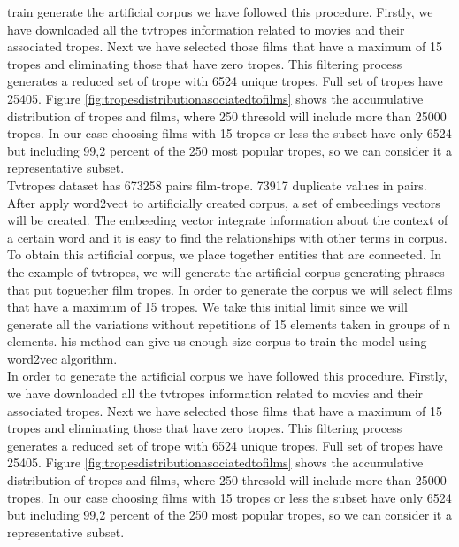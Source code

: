 \documentclass[letterpaper]{article}
\begin{document}
train
generate the artificial corpus we have followed this procedure. Firstly, we have downloaded all the tvtropes information related to movies and their associated tropes. Next we have selected those films that have a maximum of 15 tropes and eliminating those that have zero tropes. This filtering process generates a reduced set of trope with 6524 unique tropes. Full set of tropes have 25405. Figure  \ref{fig:tropesdistributionasociatedtofilms} shows the accumulative distribution of tropes and films, where 250 thresold will include more than 25000 tropes. In our case choosing films with 15 tropes or less the subset have only 6524 but including 99,2 percent of the 250 most popular tropes, so we can consider it a representative subset.\\
 Tvtropes dataset has 673258 pairs film-trope. 73917 duplicate values in pairs. After apply word2vect to artificially created corpus, a set of embeedings vectors will be created. The embeeding vector integrate information about the context of a certain word and it is easy to find the relationships with other terms in corpus.\\


 	To obtain this artificial corpus, we place together entities that are connected. In the example of tvtropes, we will generate the artificial corpus generating phrases that put toguether film tropes. In order to generate the corpus we will select films that have a maximum of 15 tropes. We take this initial limit since we will generate all the variations without repetitions of 15 elements taken in groups of n elements. his method can give us enough size corpus to train the model using word2vec algorithm. \\
	In order to generate the artificial corpus we have followed this procedure. Firstly, we have downloaded all the tvtropes information related to movies and their associated tropes. Next we have selected those films that have a maximum of 15 tropes and eliminating those that have zero tropes. This filtering process generates a reduced set of trope with 6524 unique tropes. Full set of tropes have 25405. Figure  \ref{fig:tropesdistributionasociatedtofilms} shows the accumulative distribution of tropes and films, where 250 thresold will include more than 25000 tropes. In our case choosing films with 15 tropes or less the subset have only 6524 but including 99,2 percent of the 250 most popular tropes, so we can consider it a representative subset.\\
	
\end{document}
